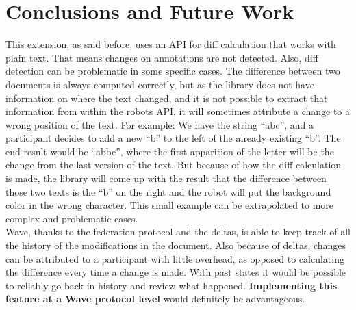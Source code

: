 \section{Conclusions and Future Work}
This extension, as said before, uses an API for diff calculation that works with plain text. That means changes on annotations are not detected. Also, diff detection can be problematic in some specific cases. The difference between two documents is always computed correctly, but as the library does not have information on where the text changed, and it is not possible to extract that information from within the robots API, it will sometimes attribute a change to a wrong position of the text. For example: We have the string ``abc'', and a participant decides to add a new ``b'' to the left of the already existing ``b''. The end result would be ``abbc'', where the first apparition of the letter will be the change from the last version of the text. But because of how the diff calculation is made, the library will come up with the result that the difference between those two texts is the ``b'' on the right and the robot will put the background color in the wrong character. This small example can be extrapolated to more complex and problematic cases.\\[.2cm]
Wave, thanks to the federation protocol and the deltas, is able to keep track of all the history of the modifications in the document. Also because of deltas, changes can be attributed to a participant with little overhead, as opposed to calculating the difference every time a change is made. With past states it would be possible to reliably go back in history and review what happened. \textbf{Implementing this feature at a Wave protocol level} would definitely be advantageous.
